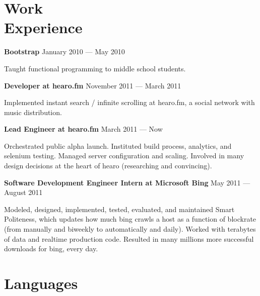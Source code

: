 \documentclass[margin,line]{resume}
\begin{document}
\begin{resume}
    \section{\mysidestyle{} Work\\Experience}

    \textbf{Bootstrap}		\hfill January 2010 — May 2010 	\par\vspace{-4.0mm}			
    	{\addtolength{\leftskip}{2 mm}
	 Taught functional programming to middle school students.
      \par}
    
    \textbf{Developer at hearo.fm}		\hfill November 2011 — March 2011	 	\par\vspace{-4.0mm}	
    	{\addtolength{\leftskip}{2 mm}
	      Implemented instant search / infinite scrolling at hearo.fm, a social network with music distribution.
	      \par}
	      
    \textbf{Lead Engineer at hearo.fm}	\hfill March 2011 — Now 					\par\vspace{-4.0mm}
          {\addtolength{\leftskip}{2 mm}
          Orchestrated public alpha launch. Instituted build process, analytics, and selenium testing. Managed server configuration and scaling. Involved in many design decisions at the heart of hearo (researching and convincing).
      \par}

 	\textbf{Software Development Engineer Intern at Microsoft Bing}		\hfill May 2011 — August 2011		\par\vspace{-4.0mm}
          {\addtolength{\leftskip}{2 mm}
          	Modeled, designed, implemented, tested, evaluated, and maintained Smart Politeness, which updates how much bing crawls a host as a function of blockrate (from manually and biweekly to automatically and daily). Worked with terabytes of data and realtime production code. Resulted in many millions more successful downloads for bing, every day. 
	\par}

    \section{\mysidestyle{} Languages} 


\end{resume}
\end{document}
